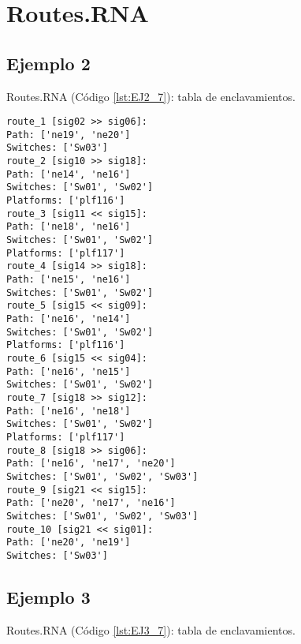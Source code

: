 \chapter{Routes.RNA}
	\label{sec:routesRNA}
	
	
	\section{Ejemplo 2}
	Routes.RNA (Código \ref{lst:EJ2_7}): tabla de enclavamientos.
	
	\begin{lstlisting}[language = {}, caption = Routes.RNA, label = {lst:EJ2_7}]
route_1 [sig02 >> sig06]:
Path: ['ne19', 'ne20']
Switches: ['Sw03']
route_2 [sig10 >> sig18]:
Path: ['ne14', 'ne16']
Switches: ['Sw01', 'Sw02']
Platforms: ['plf116']
route_3 [sig11 << sig15]:
Path: ['ne18', 'ne16']
Switches: ['Sw01', 'Sw02']
Platforms: ['plf117']
route_4 [sig14 >> sig18]:
Path: ['ne15', 'ne16']
Switches: ['Sw01', 'Sw02']
route_5 [sig15 << sig09]:
Path: ['ne16', 'ne14']
Switches: ['Sw01', 'Sw02']
Platforms: ['plf116']
route_6 [sig15 << sig04]:
Path: ['ne16', 'ne15']
Switches: ['Sw01', 'Sw02']
route_7 [sig18 >> sig12]:
Path: ['ne16', 'ne18']
Switches: ['Sw01', 'Sw02']
Platforms: ['plf117']
route_8 [sig18 >> sig06]:
Path: ['ne16', 'ne17', 'ne20']
Switches: ['Sw01', 'Sw02', 'Sw03']
route_9 [sig21 << sig15]:
Path: ['ne20', 'ne17', 'ne16']
Switches: ['Sw01', 'Sw02', 'Sw03']
route_10 [sig21 << sig01]:
Path: ['ne20', 'ne19']
Switches: ['Sw03']
	\end{lstlisting}
	\section{Ejemplo 3}
	Routes.RNA (Código \ref{lst:EJ3_7}): tabla de enclavamientos.
	
